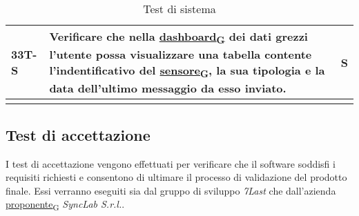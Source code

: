 \begin{longtable}{|>{\raggedright\arraybackslash}m{}|>{\raggedright\arraybackslash}m{}|>{\raggedright\arraybackslash}m{}|}
	\hline
	\textbf{33T-S}  & Verificare che nella \href{https://7last.github.io/docs/pb/documentazione-interna/glossario\#dashboard}{dashboard\textsubscript{G}} dei dati grezzi l'utente possa visualizzare una tabella contente l'indentificativo del \href{https://7last.github.io/docs/pb/documentazione-interna/glossario\#sensore}{sensore\textsubscript{G}}, la sua tipologia e la data dell'ultimo messaggio da esso inviato. & S              \\
	\hline
	\caption{Test di sistema}
\end{longtable}

\subsection{Test di accettazione}
I test di accettazione vengono effettuati per verificare che il software soddisfi i requisiti richiesti e consentono di ultimare il processo di validazione del prodotto finale.
Essi verranno eseguiti sia dal gruppo di sviluppo \textit{7Last} che dall'azienda \href{https://7last.github.io/docs/pb/documentazione-interna/glossario\#proponente}{proponente\textsubscript{G}} \textit{SyncLab S.r.l.}. \\
